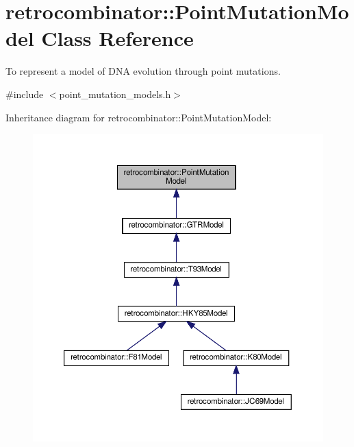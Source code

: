 \hypertarget{classretrocombinator_1_1PointMutationModel}{}\section{retrocombinator\+:\+:Point\+Mutation\+Model Class Reference}
\label{classretrocombinator_1_1PointMutationModel}


To represent a model of D\+NA evolution through point mutations.  




{\ttfamily \#include $<$point\+\_\+mutation\+\_\+models.\+h$>$}



Inheritance diagram for retrocombinator\+:\+:Point\+Mutation\+Model\+:\nopagebreak
\begin{figure}[H]
\begin{center}
\leavevmode
\includegraphics[width=350pt]{classretrocombinator_1_1PointMutationModel__inherit__graph}
\end{center}
\end{figure}
